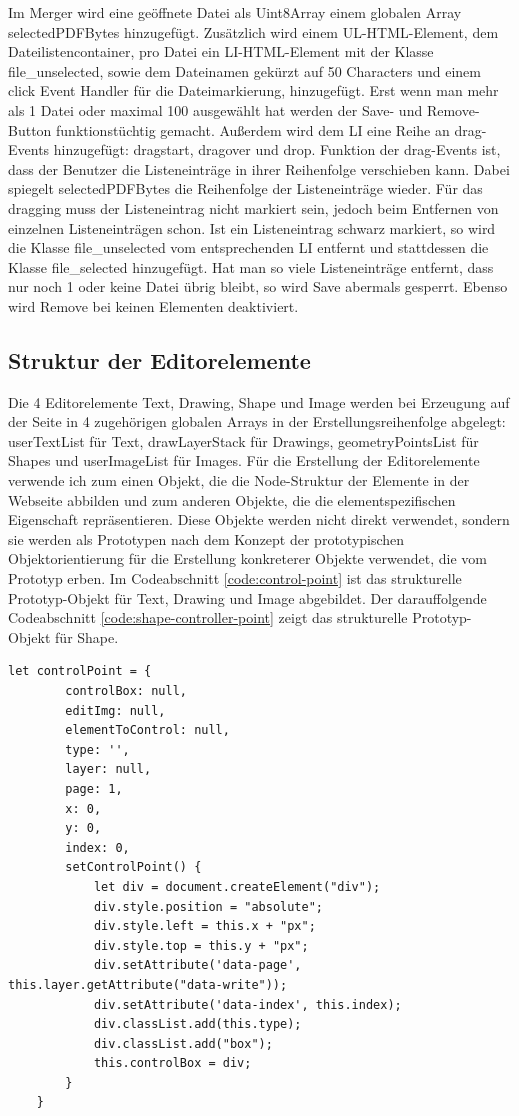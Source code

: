 Im Merger wird eine geöffnete Datei als Uint8Array einem globalen Array selectedPDFBytes hinzugefügt. Zusätzlich wird einem UL-HTML-Element, dem Dateilistencontainer, pro Datei ein LI-HTML-Element mit der Klasse file\_unselected, sowie dem Dateinamen gekürzt auf 50 Characters und einem click Event Handler für die Dateimarkierung, hinzugefügt. Erst wenn man mehr als 1 Datei oder maximal 100 ausgewählt hat werden der Save- und Remove-Button funktionstüchtig gemacht. Außerdem wird dem LI eine Reihe an drag-Events hinzugefügt: dragstart, dragover und drop. Funktion der drag-Events ist, dass der Benutzer die Listeneinträge in ihrer Reihenfolge verschieben kann. Dabei spiegelt selectedPDFBytes die Reihenfolge der Listeneinträge wieder. Für das dragging muss der Listeneintrag nicht markiert sein, jedoch beim Entfernen von einzelnen Listeneinträgen schon. Ist ein Listeneintrag schwarz markiert, so wird die Klasse file\_unselected vom entsprechenden LI entfernt und stattdessen die Klasse file\_selected hinzugefügt. Hat man so viele Listeneinträge entfernt, dass nur noch 1 oder keine Datei übrig bleibt, so wird Save abermals gesperrt. Ebenso wird Remove bei keinen Elementen deaktiviert.

\subsection{Struktur der Editorelemente}
Die 4 Editorelemente Text, Drawing, Shape und Image werden bei Erzeugung auf der Seite in 4 zugehörigen globalen Arrays in der Erstellungsreihenfolge abgelegt: userTextList für Text, drawLayerStack für Drawings, geometryPointsList für Shapes und userImageList für Images. Für die Erstellung der Editorelemente verwende ich zum einen Objekt, die die Node-Struktur der Elemente in der Webseite abbilden und zum anderen Objekte, die die elementspezifischen Eigenschaft repräsentieren. Diese Objekte werden nicht direkt verwendet, sondern sie werden als Prototypen nach dem Konzept der prototypischen Objektorientierung für die Erstellung konkreterer Objekte verwendet, die vom Prototyp erben. Im Codeabschnitt \ref{code:control-point} ist das strukturelle Prototyp-Objekt für Text, Drawing und Image abgebildet. Der darauffolgende Codeabschnitt \ref{code:shape-controller-point} zeigt das strukturelle Prototyp-Objekt für Shape.

\begin{lstlisting}[style=ES6, caption={Prototyp-Objekt für die Node-Struktur von Text, Drawing und Image}, label=code:control-point, breaklines=true]
	let controlPoint = {
		controlBox: null,
		editImg: null,
		elementToControl: null,
		type: '',
		layer: null,
		page: 1,
		x: 0,
		y: 0,
		index: 0,
		setControlPoint() {
			let div = document.createElement("div");
			div.style.position = "absolute";
			div.style.left = this.x + "px";
			div.style.top = this.y + "px";
			div.setAttribute('data-page', this.layer.getAttribute("data-write"));
			div.setAttribute('data-index', this.index);
			div.classList.add(this.type);
			div.classList.add("box");
			this.controlBox = div;
		}
	}
\end{lstlisting}

